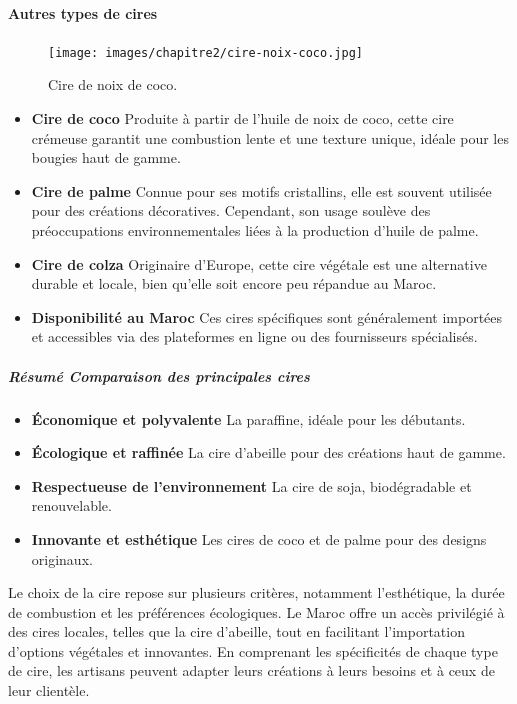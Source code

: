 \documentclass[11pt,fleqn,onecolumn,oneside]{book}
\begin{document}
\paragraph{Autres types de cires}

\begin{figure}[htbp]
    \centering
    \texttt{[image: images/chapitre2/cire-noix-coco.jpg]}
    \caption{Cire de noix de coco.}
    \label{fig:image_bougie_cire_abeille}
\end{figure}



\begin{itemize}
    \item \textbf{Cire de coco} Produite à partir de l’huile de noix de coco, cette cire crémeuse garantit une combustion lente et une texture unique, idéale pour les bougies haut de gamme.
    \item \textbf{Cire de palme} Connue pour ses motifs cristallins, elle est souvent utilisée pour des créations décoratives. Cependant, son usage soulève des préoccupations environnementales liées à la production d’huile de palme.
    \item \textbf{Cire de colza} Originaire d’Europe, cette cire végétale est une alternative durable et locale, bien qu’elle soit encore peu répandue au Maroc.
    \item \textbf{Disponibilité au Maroc} Ces cires spécifiques sont généralement importées et accessibles via des plateformes en ligne ou des fournisseurs spécialisés.
\end{itemize}

\subparagraph{Résumé Comparaison des principales cires}
\begin{itemize}
    \item \textbf{Économique et polyvalente} La paraffine, idéale pour les débutants.
    \item \textbf{Écologique et raffinée} La cire d’abeille pour des créations haut de gamme.
    \item \textbf{Respectueuse de l’environnement} La cire de soja, biodégradable et renouvelable.
    \item \textbf{Innovante et esthétique} Les cires de coco et de palme pour des designs originaux.
\end{itemize}

\begin{corollary}
Le choix de la cire repose sur plusieurs critères, notamment l’esthétique, la durée de combustion et les préférences écologiques. Le Maroc offre un accès privilégié à des cires locales, telles que la cire d’abeille, tout en facilitant l’importation d’options végétales et innovantes. En comprenant les spécificités de chaque type de cire, les artisans peuvent adapter leurs créations à leurs besoins et à ceux de leur clientèle.
\end{corollary}
\end{document}
